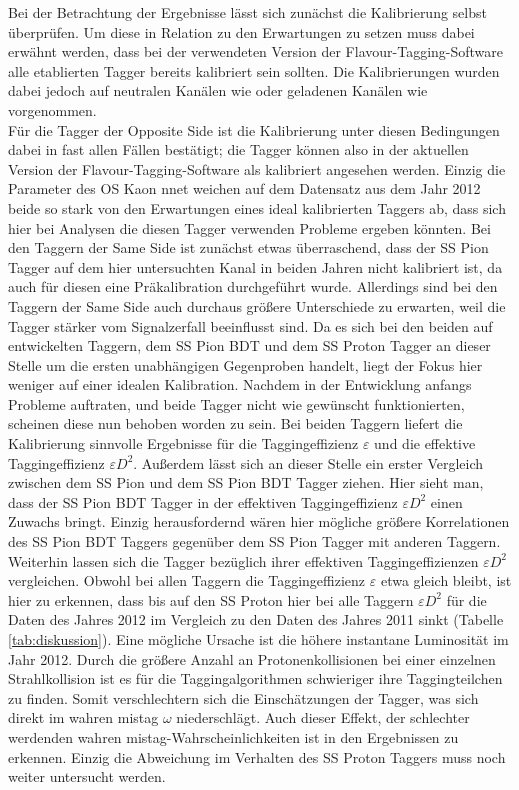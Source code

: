 Bei der Betrachtung der Ergebnisse lässt sich zunächst die Kalibrierung selbst überprüfen. Um diese in Relation zu den Erwartungen zu setzen muss dabei erwähnt werden, dass bei der verwendeten Version der Flavour-Tagging-Software alle etablierten Tagger bereits kalibriert sein sollten. Die Kalibrierungen wurden dabei jedoch auf neutralen Kanälen wie \BdToJPsiKst oder geladenen Kanälen wie \BuToJPsiKp vorgenommen.\\
Für die Tagger der Opposite Side ist die Kalibrierung unter diesen Bedingungen dabei in fast allen Fällen bestätigt; die Tagger können also in der aktuellen Version der Flavour-Tagging-Software als kalibriert angesehen werden. Einzig die Parameter des OS Kaon nnet weichen auf dem Datensatz aus dem Jahr \num{2012} beide so stark von den Erwartungen eines ideal kalibrierten Taggers ab, dass sich hier bei Analysen die diesen Tagger verwenden Probleme ergeben könnten. Bei den Taggern der Same Side ist zunächst etwas überraschend, dass der SS Pion Tagger auf dem hier untersuchten Kanal in beiden Jahren nicht kalibriert ist, da auch für diesen eine Präkalibration durchgeführt wurde. Allerdings sind bei den Taggern der Same Side auch durchaus größere Unterschiede zu erwarten, weil die Tagger stärker vom Signalzerfall beeinflusst sind. Da es sich bei den beiden auf \BdToDpi entwickelten Taggern, dem SS Pion BDT und dem SS Proton Tagger an dieser Stelle um die ersten unabhängigen Gegenproben handelt, liegt der Fokus hier weniger auf einer idealen Kalibration. Nachdem in der Entwicklung anfangs Probleme auftraten, und beide Tagger nicht wie gewünscht funktionierten, scheinen diese nun behoben worden zu sein. Bei beiden Taggern liefert die Kalibrierung sinnvolle Ergebnisse für die Taggingeffizienz $\varepsilon$ und die effektive Taggingeffizienz $\varepsilon D^2$. Außerdem lässt sich an dieser Stelle ein erster Vergleich zwischen dem SS Pion und dem SS Pion BDT Tagger ziehen. Hier sieht man, dass der SS Pion BDT Tagger in der effektiven Taggingeffizienz $\varepsilon D^2$ einen Zuwachs bringt. Einzig herausfordernd wären hier mögliche größere Korrelationen des SS Pion BDT Taggers gegenüber dem SS Pion Tagger mit anderen Taggern.\\
Weiterhin lassen sich die Tagger bezüglich ihrer effektiven Taggingeffizienzen $\varepsilon D^2$ vergleichen. Obwohl bei allen Taggern die Taggingeffizienz $\varepsilon$ etwa gleich bleibt, ist hier zu erkennen, dass bis auf den SS Proton hier bei alle Taggern  $\varepsilon D^2$ für die Daten des Jahres \num{2012} im Vergleich zu den Daten des Jahres \num{2011} sinkt (Tabelle \ref{tab:diskussion}). Eine mögliche Ursache ist die höhere instantane Luminosität im Jahr \num{2012}. Durch die größere Anzahl an Protonenkollisionen bei einer einzelnen Strahlkollision ist es für die Taggingalgorithmen schwieriger ihre Taggingteilchen zu finden. Somit verschlechtern sich die Einschätzungen der Tagger, was sich direkt im wahren mistag $\omega$ niederschlägt. Auch dieser Effekt, der schlechter werdenden wahren mistag-Wahrscheinlichkeiten ist in den Ergebnissen zu erkennen. Einzig die Abweichung im Verhalten des SS Proton Taggers muss noch weiter untersucht werden.
